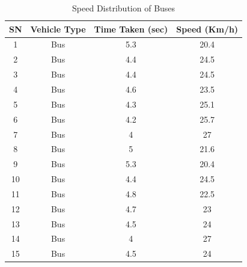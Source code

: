 \begin{table}[h!]
    \centering
    \caption{Speed Distribution of Buses}
    \begin{tabular}{|c|c|c|c|}
        \hline
        \textbf{SN}	& \textbf{Vehicle Type}	& \textbf{Time Taken (sec)}	& \textbf{Speed (Km/h)} \\ \hline
        1	&Bus	&5.3	&20.4 \\ \hline
        2	&Bus	&4.4	&24.5 \\ \hline
        3	&Bus	&4.4	&24.5 \\ \hline
        4	&Bus	&4.6	&23.5 \\ \hline
        5	&Bus	&4.3	&25.1 \\ \hline
        6	&Bus	&4.2	&25.7 \\ \hline
        7	&Bus	&4	&27 \\ \hline
        8	&Bus	&5	&21.6 \\ \hline
        9	&Bus	&5.3	&20.4 \\ \hline
        10	&Bus	&4.4	&24.5 \\ \hline
        11	&Bus	&4.8	&22.5 \\ \hline
        12	&Bus	&4.7	&23 \\ \hline
        13	&Bus	&4.5	&24 \\ \hline
        14	&Bus	&4	&27 \\ \hline
        15	&Bus	&4.5	&24 \\ \hline
    \end{tabular}
\end{table}

